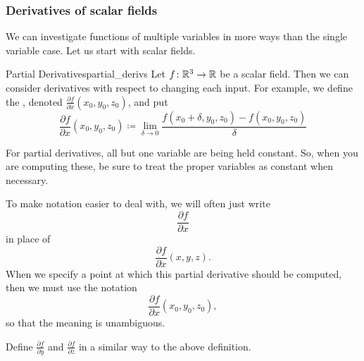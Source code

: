                 \subsubsection{Derivatives of scalar fields}
                        We can investigate functions of multiple variables in more ways than the single variable case.  Let us start with scalar fields.
                        
                        \begin{df}{Partial Derivatives}{partial_derivs}
                        Let $f\colon \mathbb{R}^3 \to \mathbb{R}$ be a scalar field.  Then we can consider derivatives with respect to changing each input.  For example, we define the  , denoted $\frac{\partial f}{\partial x}(x_0,y_0,z_0)$, and put
                        \[
                        \frac{\partial f}{\partial x}(x_0,y_0,z_0)\coloneqq \lim_{\delta \to 0} \frac{f(x_0+\delta,y_0,z_0)-f(x_0,y_0,z_0)}{\delta}
                        \]
                        \end{df}
                       
                        
                        \begin{remark}
                        For partial derivatives, all but one variable are being held constant.  So, when you are computing these, be sure to treat the proper variables as constant when necessary.
                        \end{remark}
                        
                        To make notation easier to deal with, we will often just write 
                        \[
                        \frac{\partial f}{\partial x}
                        \]
                        in place of
                        \[
                        \frac{\partial f}{\partial x}(x,y,z).
                        \]
                        When we specify a point at which this partial derivative should be computed, then we must use the notation
                        \[
                         \frac{\partial f}{\partial x}(x_0,y_0,z_0),
                        \]
                        so that the meaning is unambiguous.
                        
                        \begin{exercise}
                        Define $\frac{\partial f}{\partial y}$ and $\frac{\partial f}{\partial z}$ in a similar way to the above definition.
                        \end{exercise}
                        
